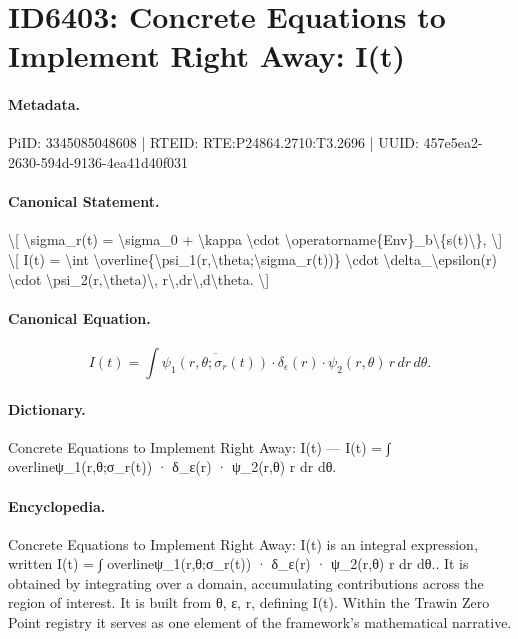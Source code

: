 \section*{ID6403: Concrete Equations to Implement Right Away: I(t)}
\paragraph{Metadata.}
PiID: 3345085048608 | RTEID: RTE:P24864.2710:T3.2696 | UUID: 457e5ea2-2630-594d-9136-4ea41d40f031

\paragraph{Canonical Statement.}
\textbackslash{}[ \textbackslash{}sigma\_r(t) = \textbackslash{}sigma\_0 + \textbackslash{}kappa \textbackslash{}cdot \textbackslash{}operatorname\{Env\}\_b\textbackslash{}\{s(t)\textbackslash{}\}, \textbackslash{}] \textbackslash{}[ I(t) = \textbackslash{}int \textbackslash{}overline\{\textbackslash{}psi\_1(r,\textbackslash{}theta;\textbackslash{}sigma\_r(t))\} \textbackslash{}cdot \textbackslash{}delta\_\textbackslash{}epsilon(r) \textbackslash{}cdot \textbackslash{}psi\_2(r,\textbackslash{}theta)\textbackslash{}, r\textbackslash{},dr\textbackslash{},d\textbackslash{}theta. \textbackslash{}]

\paragraph{Canonical Equation.}
\[
I(t) = \int \overline{\psi_1(r,\theta;\sigma_r(t))} \cdot \delta_\epsilon(r) \cdot \psi_2(r,\theta)\, r\,dr\,d\theta.
\]

\paragraph{Dictionary.}
Concrete Equations to Implement Right Away: I(t) — I(t) = ∫ overlineψ\_1(r,θ;σ\_r(t)) · δ\_ε(r) · ψ\_2(r,θ) r dr dθ.

\paragraph{Encyclopedia.}
Concrete Equations to Implement Right Away: I(t) is an integral expression, written I(t) = ∫ overlineψ\_1(r,θ;σ\_r(t)) · δ\_ε(r) · ψ\_2(r,θ) r dr dθ.. It is obtained by integrating over a domain, accumulating contributions across the region of interest. It is built from θ, ε, r, defining I(t). Within the Trawin Zero Point registry it serves as one element of the framework's mathematical narrative.

